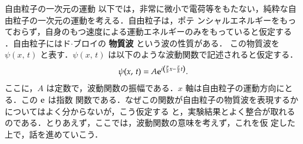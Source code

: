             \begin{mysmallsec}{自由粒子の一次元の運動}
            以下では，非常に微小で電荷等をもたない，純粋な自由粒子の一次元の運動を考える．自由粒子は，ポテ
            ンシャルエネルギーをもっておらず，自身のもつ速度による運動エネルギーのみをもっていると仮定する
            ．自由粒子にはド$\cdot$ブロイの \textbf{物質波} という波の性質がある．
            この物質波を $\psi(x,\,t) $ と表す．$\psi(x,\,t) $ は以下のような波動関数で記述されると仮定する．
                \begin{align}\label{e_bussituha}
                    \psi(x,\,t) = A\e^{i\left( \frac{p}{\hbar}x-\frac{E}{\hbar} t\right)}.
                \end{align}
            ここに，$A$ は定数で，波動関数の振幅である．$x$ 軸は自由粒子の運動方向にとる．この $\mathrm{e}$ は指数
            関数である．なぜこの関数が自由粒子の物質波を表現するかについてはよく分からないが，こう仮定する
            と，実験結果とよく整合が取れるのである．とりあえず，ここでは，波動関数の意味を考えず，これを仮
            定した上で，話を進めていこう．
            \end{mysmallsec}

